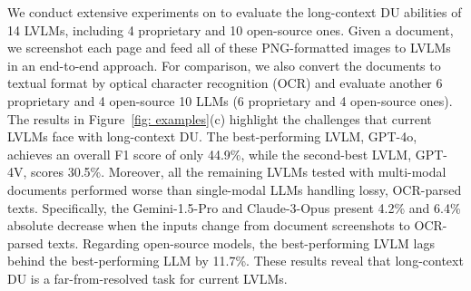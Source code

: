 We conduct extensive experiments on \benchmarkname to evaluate the long-context DU abilities of 14 LVLMs, including 4 proprietary and 10 open-source ones. Given a document, we screenshot each page and feed all of these PNG-formatted images to LVLMs in an end-to-end approach. For comparison, we also convert the documents to textual format by optical character recognition (OCR) and evaluate another 6 proprietary and 4 open-source 10 LLMs (6 proprietary and 4 open-source ones). The results in Figure~\ref{fig: examples}(c) highlight the challenges that current LVLMs face with long-context DU. The best-performing LVLM, GPT-4o, achieves an overall F1 score of only 44.9\%, while the second-best LVLM, GPT-4V, scores 30.5\%. Moreover, all the remaining LVLMs tested with multi-modal documents performed worse than single-modal LLMs handling lossy, OCR-parsed texts. Specifically, the Gemini-1.5-Pro and Claude-3-Opus present 4.2\% and 6.4\% absolute decrease when the inputs change from document screenshots to OCR-parsed texts. Regarding open-source models, the best-performing LVLM lags behind the best-performing LLM by 11.7\%. These results reveal that long-context DU is a far-from-resolved task for current LVLMs.

